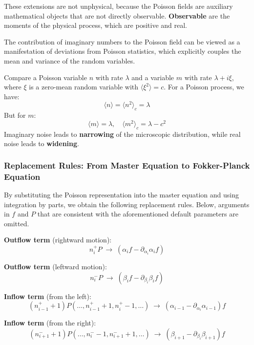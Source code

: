These extensions are not unphysical, because the Poisson fields are auxiliary mathematical objects that are not directly observable. \textbf{Observable} are the moments of the physical process, which are positive and real.

\begin{remark}
The contribution of imaginary numbers to the Poisson field can be viewed as a manifestation of deviations from Poisson statistics, which explicitly couples the mean and variance of the random variables.

Compare a Poisson variable $n$ with rate $\lambda$ and a variable $m$ with rate $\lambda + i\xi$, where $\xi$ is a zero-mean random variable with $\langle \xi^2 \rangle = c$. For a Poisson process, we have:
\[
\langle n \rangle = \langle n^2 \rangle_c = \lambda
\]
But for $m$:
\[
\langle m \rangle = \lambda, \quad \langle m^2 \rangle_c = \lambda - c^2
\]
Imaginary noise leads to \textbf{narrowing} of the microscopic distribution, while real noise leads to \textbf{widening}.
\end{remark}

\subsubsection{Replacement Rules: From Master Equation to Fokker-Planck Equation}

By substituting the Poisson representation into the master equation and using integration by parts, we obtain the following replacement rules. Below, arguments in $f$ and $P$ that are consistent with the aforementioned default parameters are omitted.

\begin{derivation}
\textbf{Outflow term} (rightward motion):
\begin{equation}\label{eq:replace-out-right}
n_i^+ P \;\to\; (\alpha_i f - \partial_{\alpha_i}\alpha_i f)
\end{equation}

\textbf{Outflow term} (leftward motion):
\begin{equation}\label{eq:replace-out-left}
n_i^- P \;\to\; (\beta_i f - \partial_{\beta_i}\beta_i f)
\end{equation}

\textbf{Inflow term} (from the left):
\begin{equation}\label{eq:replace-in-left}
(n_{i-1}^+ + 1)P(\ldots, n_{i-1}^+ + 1, n_i^+ - 1, \ldots) \;\to\; (\alpha_{i-1} - \partial_{\alpha_i}\alpha_{i-1})f
\end{equation}

\textbf{Inflow term} (from the right):
\begin{equation}\label{eq:replace-in-right}
(n_{i+1}^- + 1)P(\ldots, n_i^- - 1, n_{i+1}^- + 1, \ldots) \;\to\; (\beta_{i+1} - \partial_{\beta_i}\beta_{i+1})f
\end{equation}
\end{derivation}

